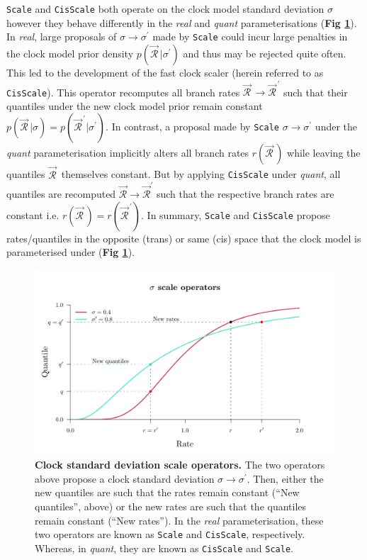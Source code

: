 \documentclass[10pt,letterpaper]{article}
\begin{document}
 \texttt{Scale} and \texttt{CisScale} both operate on the clock model standard deviation $\sigma$ however they behave differently in the \textit{real} and \textit{quant} parameterisations (\textbf{Fig \ref{fig:clockSDoperators}}).
In \textit{real}, large proposals of $\sigma \rightarrow \sigma^\prime$ made by  \texttt{Scale} could incur large penalties in the clock model prior density $p(\vec{\mathcal{R}}^{\,}|\sigma^\prime)$ and thus may be rejected quite often. 
This led to the development of the fast clock scaler \cite{zhang2020improving} (herein referred to as \texttt{CisScale}).
This operator recomputes all branch rates $\vec{\mathcal{R}}^{\,} \rightarrow \vec{\mathcal{R}}^{\, \prime}$ such that their quantiles under the new clock model prior remain constant $p(\vec{\mathcal{R}}^{\,}|\sigma) = p(\vec{\mathcal{R}}^{\, \prime}|\sigma^\prime)$.
In contrast, a proposal made by \texttt{Scale} $\sigma \rightarrow \sigma^\prime$ under the \textit{quant} parameterisation implicitly alters all branch rates $r(\vec{\mathcal{R}}^{\,})$ while leaving the quantiles $\vec{\mathcal{R}}^{\,}$ themselves constant.
But by applying \texttt{CisScale} under \textit{quant},
all quantiles are recomputed $\vec{\mathcal{R}} \rightarrow \vec{\mathcal{R}}^\prime$  such that the respective branch rates are constant i.e. $r(\vec{\mathcal{R}}^{\,}) = r(\vec{\mathcal{R}}^{\,\prime})$.
In summary, \texttt{Scale} and \texttt{CisScale} propose rates/quantiles in the opposite (trans) or same (cis) space that the clock model is parameterised under (\textbf{Fig \ref{fig:clockSDoperators}}).




\begin{figure}[!h]
\centering
\includegraphics[width=\textwidth]{Figures/clockSD.pdf}
\caption{\textbf{Clock standard deviation scale operators.}
The two operators above propose a clock standard deviation $\sigma \rightarrow \sigma^\prime$. 
Then, either the new quantiles are such that the rates remain constant (``New quantiles'', above) or the new rates are  such that the quantiles remain constant (``New rates''). 
In the \textit{real} parameterisation, these two operators are known as \texttt{Scale} and \texttt{CisScale}, respectively.
Whereas, in \textit{quant}, they are known as \texttt{CisScale} and \texttt{Scale}.    }
\label{fig:clockSDoperators}
\end{figure}
\end{document}
